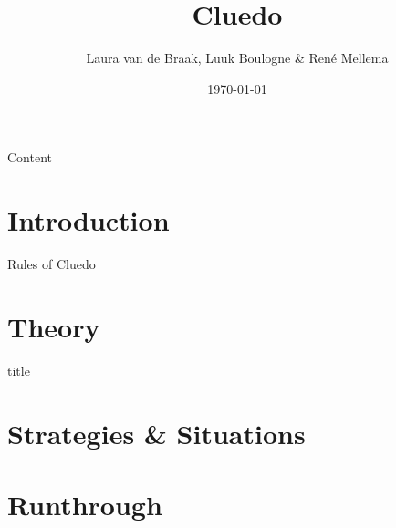 \documentclass{beamer}
\title{Cluedo}
\author{Laura van de Braak, Luuk Boulogne \& Ren\'e Mellema}
\date{\today}
\begin{document}
\begin{frame}
    \titlepage
\end{frame}

\begin{frame}{Content}
  \tableofcontents
\end{frame}

\section{Introduction}

\begin{frame}{Rules of Cluedo}
  
\end{frame}

\section{Theory}

\begin{frame}{title}

\end{frame}

\section{Strategies \& Situations}


\section{Runthrough}

\end{document}
